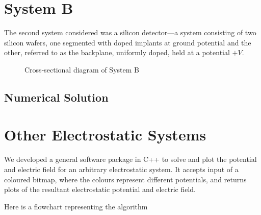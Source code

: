 \documentclass[12pt, a4paper]{article}
\begin{document}
\section{System B}

The second system considered was a silicon detector---a system consisting of two
silicon wafers, one segmented with doped implants at ground potential and the other,
referred to as the backplane, uniformly doped, held at a potential $+V$.

\begin{figure}[h!]
\begin{center}
\end{center}
\caption{Cross-sectional diagram of System B}
\end{figure}

\subsection{Numerical Solution}

\section{Other Electrostatic Systems}

We developed a general software package in C++ to solve and plot the potential and
electric field for an arbitrary electrostatic system. It accepts input of a coloured
bitmap, where the colours represent different potentials, and returns plots of the
resultant electrostatic potential and electric field.

Here is a flowchart representing the algorithm 
\end{document}
